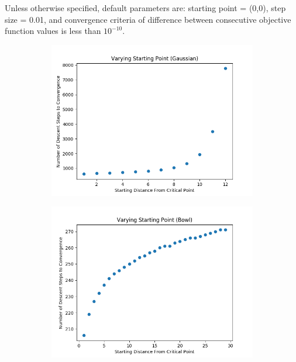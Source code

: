 \documentclass[8pt]{article}
\begin{document}
Unless otherwise specified, default parameters are: starting point = (0,0), step size = 0.01, and convergence criteria of difference between consecutive objective function values is less than $10^{-10}$.
%
\begin{figure}[H]
\centering
        \begin{subfigure}[b]{0.38\textwidth}
                \includegraphics[width=\linewidth]{../P1/figs/start_gauss.png}
        \end{subfigure}%
        \begin{subfigure}[b]{0.38\textwidth}
                \includegraphics[width=\linewidth]{../P1/figs/start_bowl.png}
        \end{subfigure}%
\end{figure}
\end{document}
